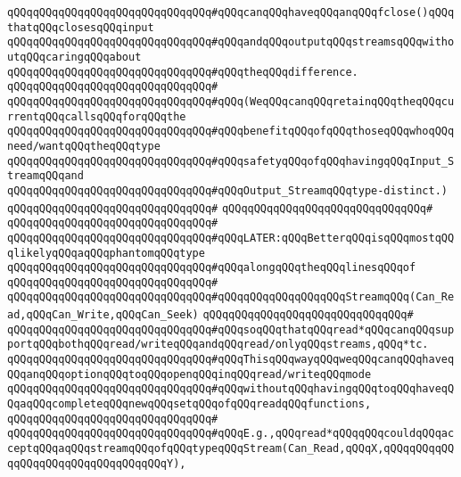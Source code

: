\verb|qQQqqQQqqQQqqQQqqQQqqQQqqQQqqQQq#qQQqcanqQQqhaveqQQqanqQQqfclose()qQQqthatqQQqclosesqQQqinput|\newline
\verb|qQQqqQQqqQQqqQQqqQQqqQQqqQQqqQQq#qQQqandqQQqoutputqQQqstreamsqQQqwithoutqQQqcaringqQQqabout|\newline
\verb|qQQqqQQqqQQqqQQqqQQqqQQqqQQqqQQq#qQQqtheqQQqdifference.|\newline
\verb|qQQqqQQqqQQqqQQqqQQqqQQqqQQqqQQq#|\newline
\verb|qQQqqQQqqQQqqQQqqQQqqQQqqQQqqQQq#qQQq(WeqQQqcanqQQqretainqQQqtheqQQqcurrentqQQqcallsqQQqforqQQqthe|\newline
\verb|qQQqqQQqqQQqqQQqqQQqqQQqqQQqqQQq#qQQqbenefitqQQqofqQQqthoseqQQqwhoqQQqneed/wantqQQqtheqQQqtype|\newline
\verb|qQQqqQQqqQQqqQQqqQQqqQQqqQQqqQQq#qQQqsafetyqQQqofqQQqhavingqQQqInput_StreamqQQqand|\newline
\verb|qQQqqQQqqQQqqQQqqQQqqQQqqQQqqQQq#qQQqOutput_StreamqQQqtype-distinct.)|\newline
\verb|qQQqqQQqqQQqqQQqqQQqqQQqqQQqqQQq#|\newline
\verb|qQQqqQQqqQQqqQQqqQQqqQQqqQQqqQQq#|\newline
\verb|qQQqqQQqqQQqqQQqqQQqqQQqqQQqqQQq#|\newline
\verb|qQQqqQQqqQQqqQQqqQQqqQQqqQQqqQQq#qQQqLATER:qQQqBetterqQQqisqQQqmostqQQqlikelyqQQqaqQQqphantomqQQqtype|\newline
\verb|qQQqqQQqqQQqqQQqqQQqqQQqqQQqqQQq#qQQqalongqQQqtheqQQqlinesqQQqof|\newline
\verb|qQQqqQQqqQQqqQQqqQQqqQQqqQQqqQQq#|\newline
\verb|qQQqqQQqqQQqqQQqqQQqqQQqqQQqqQQq#qQQqqQQqqQQqqQQqqQQqStreamqQQq(Can_Read,qQQqCan_Write,qQQqCan_Seek)|\newline
\verb|qQQqqQQqqQQqqQQqqQQqqQQqqQQqqQQq#|\newline
\verb|qQQqqQQqqQQqqQQqqQQqqQQqqQQqqQQq#qQQqsoqQQqthatqQQqread*qQQqcanqQQqsupportqQQqbothqQQqread/writeqQQqandqQQqread/onlyqQQqstreams,qQQq*tc.|\newline
\verb|qQQqqQQqqQQqqQQqqQQqqQQqqQQqqQQq#qQQqThisqQQqwayqQQqweqQQqcanqQQqhaveqQQqanqQQqoptionqQQqtoqQQqopenqQQqinqQQqread/writeqQQqmode|\newline
\verb|qQQqqQQqqQQqqQQqqQQqqQQqqQQqqQQq#qQQqwithoutqQQqhavingqQQqtoqQQqhaveqQQqaqQQqcompleteqQQqnewqQQqsetqQQqofqQQqreadqQQqfunctions,|\newline
\verb|qQQqqQQqqQQqqQQqqQQqqQQqqQQqqQQq#|\newline
\verb|qQQqqQQqqQQqqQQqqQQqqQQqqQQqqQQq#qQQqE.g.,qQQqread*qQQqqQQqcouldqQQqacceptqQQqaqQQqstreamqQQqofqQQqtypeqQQqStream(Can_Read,qQQqX,qQQqqQQqqQQqqQQqqQQqqQQqqQQqqQQqqQQqY),|\newline
